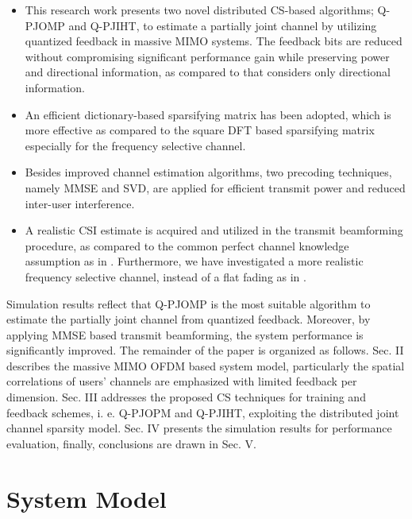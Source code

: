 \begin{itemize}
    \item This research work presents two novel distributed CS-based algorithms; Q-PJOMP and Q-PJIHT, to estimate a partially joint channel by utilizing quantized feedback in massive MIMO systems. The feedback bits are reduced without compromising significant performance gain while preserving power and directional information, as compared to \cite{mainref-1bit} that considers only directional information. 
    \item An efficient dictionary-based sparsifying matrix has been adopted, which is more effective as compared to the square DFT based sparsifying matrix especially for the frequency selective channel.
     \item Besides improved channel estimation algorithms, two precoding techniques, namely MMSE and SVD, are applied for efficient transmit power and reduced inter-user interference.
    \item A realistic CSI estimate is acquired and utilized in the transmit beamforming procedure, as compared to the common perfect channel knowledge assumption as in  \cite{mainref-joint,mainref-1bit}. Furthermore, we have investigated a more realistic frequency selective channel, instead of a flat fading as in \cite{mainref-joint,mainref-1bit}. \end{itemize}

Simulation results reflect that Q-PJOMP is the most suitable algorithm to estimate the partially joint channel from quantized feedback. Moreover,  by applying MMSE based transmit beamforming, the system performance is significantly improved.  The remainder of the paper is organized as follows. Sec.
II describes the massive MIMO OFDM based system model,
 particularly the spatial correlations of users' channels are emphasized with limited feedback per dimension. Sec. III addresses the proposed CS techniques for training and feedback schemes, i. e. Q-PJOPM and Q-PJIHT, exploiting the distributed joint channel sparsity model. Sec. IV presents the simulation results for performance evaluation, finally, conclusions are drawn in Sec. V.


\section{System Model}
\label{sec:sysmodel}
